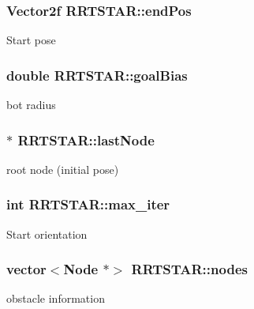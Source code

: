 \subsubsection[{\texorpdfstring{end\+Pos}{endPos}}]{\setlength{\rightskip}{0pt plus 5cm}Vector2f R\+R\+T\+S\+T\+A\+R\+::end\+Pos}\hypertarget{classRRTSTAR_a220f337b1e11e8308b1bb590e0ff926a}{}\label{classRRTSTAR_a220f337b1e11e8308b1bb590e0ff926a}
Start pose 
\subsubsection[{\texorpdfstring{goal\+Bias}{goalBias}}]{\setlength{\rightskip}{0pt plus 5cm}double R\+R\+T\+S\+T\+A\+R\+::goal\+Bias}\hypertarget{classRRTSTAR_ab458943c70394087a8ddc5f8b2f0fc79}{}\label{classRRTSTAR_ab458943c70394087a8ddc5f8b2f0fc79}
bot radius 
\subsubsection[{\texorpdfstring{last\+Node}{lastNode}}]{$\ast$ R\+R\+T\+S\+T\+A\+R\+::last\+Node}\hypertarget{classRRTSTAR_a46e3d08a8bd512c4f5747cdfbea41228}{}\label{classRRTSTAR_a46e3d08a8bd512c4f5747cdfbea41228}
root node (initial pose) 
\subsubsection[{\texorpdfstring{max\+\_\+iter}{max_iter}}]{\setlength{\rightskip}{0pt plus 5cm}int R\+R\+T\+S\+T\+A\+R\+::max\+\_\+iter}\hypertarget{classRRTSTAR_a9831be75ba6cce1bddfba73c9639e8c4}{}\label{classRRTSTAR_a9831be75ba6cce1bddfba73c9639e8c4}
Start orientation 
\subsubsection[{\texorpdfstring{nodes}{nodes}}]{\setlength{\rightskip}{0pt plus 5cm}vector$<${\bf Node} $\ast$$>$ R\+R\+T\+S\+T\+A\+R\+::nodes}\hypertarget{classRRTSTAR_aef5c314d28c8ec948f07efa5f4cabefe}{}\label{classRRTSTAR_aef5c314d28c8ec948f07efa5f4cabefe}
obstacle information 
